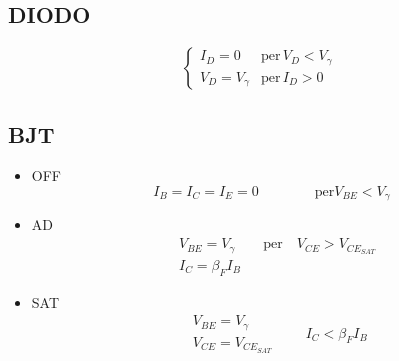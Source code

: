 \documentclass{article}
\begin{document}
\subsection*{DIODO}

\begin{minipage}{0.4\textwidth}
\end{minipage}
\begin{minipage}{0.5\textwidth}
    \[
    \begin{cases}
        I_D = 0 & \text{per} \, V_D < V_\gamma\\
        V_D = V_\gamma & \text{per}\, I_D > 0
    \end{cases}
    \]
\end{minipage}



\subsection*{BJT}
\begin{minipage}{0.4\textwidth}
\end{minipage}
\begin{minipage}{0.5\textwidth}
    \begin{itemize}
        \item OFF
            \[ I_B = I_C = I_E = 0 \qquad\qquad \text{per} V_{BE} < V_\gamma \]

        \item AD
            \[
                \begin{aligned}
                    &V_{BE} = V_\gamma \qquad \text{per}\quad V_{CE} > V_{CE_{SAT}}\\
                    &I_C = \beta_F I_B
                \end{aligned}
            \]
        \item SAT
            \[
                \begin{aligned}
                &V_{BE} = V_\gamma \\
                &V_{CE} = V_{CE_{SAT}}
                \end{aligned} \qquad I_C < \beta_F I_B
            \]
    \end{itemize}
\end{minipage}
\end{document}
